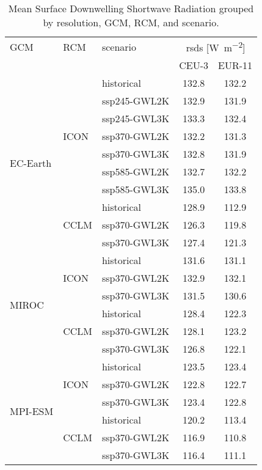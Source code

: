 \begin{table}[!htbp]
\centering
\caption{Mean Surface Downwelling Shortwave Radiation grouped by resolution, GCM, RCM, and scenario.}
\label{Table:rsds_mean_values}
\begin{tabular}{lll|cc}
\toprule
GCM & RCM & scenario & \multicolumn{2}{c}{rsds [\si{\watt\per\square\meter}]} \\
 &  &  & CEU-3 & EUR-11 \\
\midrule
\multirow{10}{*}{EC-Earth} & \multirow{7}{*}{ICON} & historical & 132.8 & 132.2 \\
 &  & ssp245-GWL2K & 132.9 & 131.9 \\
 &  & ssp245-GWL3K & 133.3 & 132.4 \\
 &  & ssp370-GWL2K & 132.2 & 131.3 \\
 &  & ssp370-GWL3K & 132.8 & 131.9 \\
 &  & ssp585-GWL2K & 132.7 & 132.2 \\
 &  & ssp585-GWL3K & 135.0 & 133.8 \\
\cmidrule(lr){2-5}
 & \multirow{3}{*}{CCLM} & historical & 128.9 & 112.9 \\
 &  & ssp370-GWL2K & 126.3 & 119.8 \\
 &  & ssp370-GWL3K & 127.4 & 121.3 \\
\cmidrule(lr){1-5}
\multirow{6}{*}{MIROC} & \multirow{3}{*}{ICON} & historical & 131.6 & 131.1 \\
 &  & ssp370-GWL2K & 132.9 & 132.1 \\
 &  & ssp370-GWL3K & 131.5 & 130.6 \\
\cmidrule(lr){2-5}
 & \multirow{3}{*}{CCLM} & historical & 128.4 & 122.3 \\
 &  & ssp370-GWL2K & 128.1 & 123.2 \\
 &  & ssp370-GWL3K & 126.8 & 122.1 \\
\cmidrule(lr){1-5}
\multirow{6}{*}{MPI-ESM} & \multirow{3}{*}{ICON} & historical & 123.5 & 123.4 \\
 &  & ssp370-GWL2K & 122.8 & 122.7 \\
 &  & ssp370-GWL3K & 123.4 & 122.8 \\
\cmidrule(lr){2-5}
 & \multirow{3}{*}{CCLM} & historical & 120.2 & 113.4 \\
 &  & ssp370-GWL2K & 116.9 & 110.8 \\
 &  & ssp370-GWL3K & 116.4 & 111.1 \\
\bottomrule
\end{tabular}
\end{table}